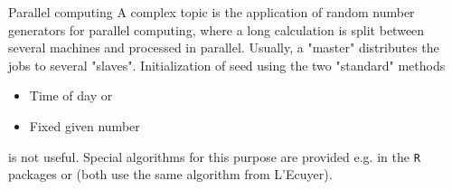\documentclass[11pt,compress,t,notes=noshow, xcolor=table]{beamer}
\begin{document}
\begin{vbframe}{Parallel computing}
A complex topic is the application of random number generators for parallel computing, where a long calculation is split between several machines and processed in parallel.
Usually, a "master" distributes the jobs to several "slaves".
Initialization of seed using the two "standard" methods
\begin{itemize}
  \item Time of day or
  \item Fixed given number
\end{itemize}
is not useful.
Special algorithms for this purpose are provided e.g. in the \texttt{R} packages  or
 (both use the same algorithm from L'Ecuyer).
\end{vbframe}



\endlecture
\end{document}
